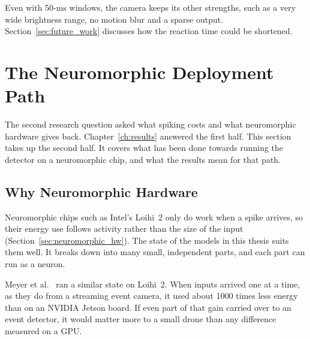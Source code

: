\documentclass[11pt, a4paper]{report}
\begin{document}
Even with 50-ms windows, the camera keeps its other strengths, such as a very wide brightness range, no motion blur and a sparse output. Section~\ref{sec:future_work} discusses how the reaction time could be shortened.

\section{The Neuromorphic Deployment Path}
\label{sec:neuro_case}
The second research question asked what spiking costs and what neuromorphic hardware gives back.
Chapter~\ref{ch:results} answered the first half. This section takes up the second half. It covers what has been done towards running the detector on a neuromorphic chip, and what the results mean for that path.

\subsection{Why Neuromorphic Hardware}
Neuromorphic chips such as Intel's Loihi~2 only do work when a spike arrives, so their energy use follows
activity rather than the size of the input (Section~\ref{sec:neuromorphic_hw}). The state of the models in
this thesis suits them well. It breaks down into many small, independent parts, and each part can run as a
neuron.

Meyer et al.~\cite{meyer2024diagonal} ran a similar state on Loihi~2. When
inputs arrived one at a time, as they do from a streaming event camera, it used about 1000 times less energy
than on an NVIDIA Jetson board. If even part of that gain carried over to an event detector, it would matter
more to a small drone than any difference measured on a GPU.
\end{document}

